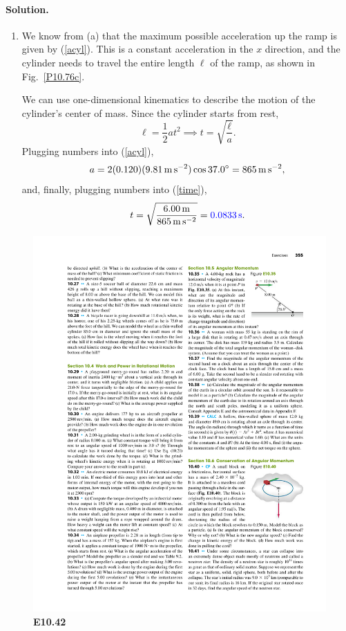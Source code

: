 \documentclass[11pt]{article}
\newcommand{\refeq}[1]{(\ref{#1})}
\newcommand{\beq}{\begin{equation*}}
\newcommand{\eeq}{\end{equation*}}
\newcommand{\beqn}{\begin{equation}}
\newcommand{\eeqn}{\end{equation}}
\newenvironment{solution}
{
    \paragraph{Solution.}
    \ignorespaces
}
{
    \bigskip
}
\begin{document}
\begin{solution}
\begin{enumerate}
		\item We know from (a) that the maximum possible acceleration up the ramp is given by \refeq{acyl}.  This is a constant acceleration in the $x$ direction, and the cylinder needs to travel the entire length $\ell$ of the ramp, as shown in Fig.~\ref{P10.76c}.
		
			We can use one-dimensional kinematics to describe the motion of the cylinder's center of mass.  Since the cylinder starts from rest,
			\beqn \label{time}
				\ell = \frac{1}{2} a t^2 \implies t = \sqrt{\frac{\ell}{a}}.
			\eeqn
			Plugging numbers into \refeq{acyl},
			\beq
				a = 2 (0.120) (\sig) \cos{37.0^\circ} = \SI{865}{\meter\per\square\second},
			\eeq
			and, finally, plugging numbers into \refeq{time},
			\beq
				t = \sqrt{\frac{\SI{6.00}{\meter}}{\SI{865}{\meter\per\square\second}}} = {\color{blue} \SI{0.0833}{\second}}.
			\eeq
	\end{enumerate}
\end{solution}


\clearpage
\begin{figure} \centering
	\includegraphics{E10-42}
	\caption{\textbf{E10.42}}
	\label{E10.42}
\end{figure}
\end{document}
